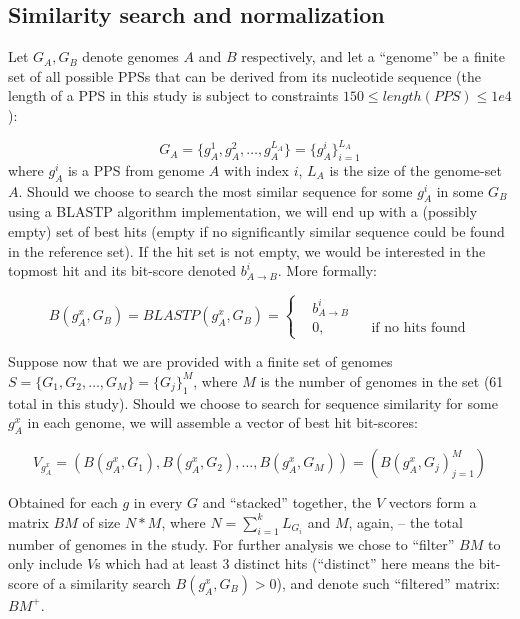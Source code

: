 \subsection{Similarity search and normalization}
\label{simsearch}
Let $G_A, G_B$ denote genomes $A$ and $B$ respectively, and let a ``genome'' be
a finite set of all possible PPSs that can be derived from its nucleotide
sequence (the length of a PPS in this study is subject to constraints $150 \leq
length(PPS) \leq 1e4$):

\begin{equation}
G_A = \{g_A^1, g_A^2, \ldots, g_A^{L_A}\} = \{g_A^i\}_{i=1}^{L_A}
\end{equation}
where $g_A^i$ is a PPS from genome $A$ with index $i$, $L_A$ is the size of
the genome-set $A$.
Should we choose to search the most similar sequence for some $g_A^i$ in some
$G_B$ using a BLASTP algorithm implementation, we will end up with a (possibly
empty) set of best hits (empty if no significantly similar sequence could be
found in the reference set). If the hit set is not empty, we would be
interested in the topmost hit and its bit-score denoted $b_{A \rightarrow
B}^i$. More formally:

\begin{equation}
B(g_A^x, G_B) = BLASTP(g_A^x, G_B)=\left \{
\begin{aligned}
&b_{A \rightarrow B}^i\\
&0, && \text{if no hits found}
\end{aligned} \right.
\end{equation}

Suppose now that we are provided with a finite set of genomes \\
$S = \{G_1, G_2, \ldots, G_M\} = \{G_j\}_1^M$, where $M$ is the number of
genomes in the set (61 total in this study). Should we choose to search for
sequence similarity for some $g_A^x$ in each genome, we will assemble a
vector of best hit bit-scores:

\begin{equation}
V_{g_A^x} = (B(g_A^x, G_1), B(g_A^x, G_2), \ldots, B(g_A^x, G_M)) = (B(g_A^x,
G_j)_{j=1}^M)
\end{equation}

Obtained for each $g$ in every $G$ and ``stacked'' together, the $V$ vectors
form a matrix $BM$ of size $N*M$, where $N=\sum_{i=1}^k L_{G_i}$ and $M$,
again, -- the total number of genomes in the study.
For further analysis we chose
to ``filter'' $BM$ to only include $V$s which had at least 3 distinct hits
(``distinct'' here means the bit-score of a similarity search $B(g_A^x,
G_B)>0$), and denote such ``filtered'' matrix: $BM^+$.

